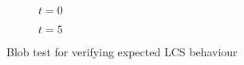\begin{figure}[htpb]
\centering
    \begin{subfigure}[b]{0.475\textwidth}
        \centering
        
        \caption[]{{\small $t=0$}}
        \label{fig:u0_dom_err_dp54}
    \end{subfigure}
    \begin{subfigure}[b]{0.475\textwidth}
        \centering
        
        \caption[]{{\small $t=5$}}
        \label{fig:u0_dom_err_dp87}
    \end{subfigure}
\caption[Veni, vidi, Aviici]{Blob test for verifying expected LCS behaviour}
    \label{fig:u0_dom_errs}
\end{figure}

